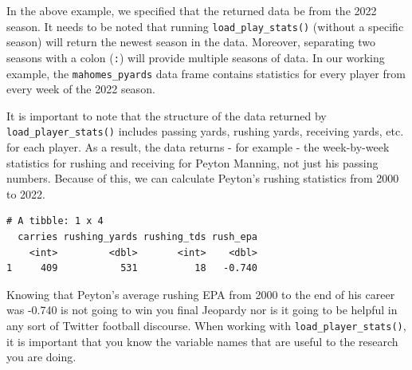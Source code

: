 \documentclass[
  letterpaper,
]{krantz}
\begin{document}
In the above example, we specified that the returned data be from the
2022 season. It needs to be noted that running
\texttt{load\_play\_stats()} (without a specific season) will return the
newest season in the data. Moreover, separating two seasons with a colon
(\texttt{:}) will provide multiple seasons of data. In our working
example, the \texttt{mahomes\_pyards} data frame contains statistics for
every player from every week of the 2022 season.

It is important to note that the structure of the data returned by
\texttt{load\_player\_stats()} includes passing yards, rushing yards,
receiving yards, etc. for each player. As a result, the data returns -
for example - the week-by-week statistics for rushing and receiving for
Peyton Manning, not just his passing numbers. Because of this, we can
calculate Peyton's rushing statistics from 2000 to 2022.

\begin{verbatim}
# A tibble: 1 x 4
  carries rushing_yards rushing_tds rush_epa
    <int>         <dbl>       <int>    <dbl>
1     409           531          18   -0.740
\end{verbatim}

Knowing that Peyton's average rushing EPA from 2000 to the end of his
career was -0.740 is not going to win you final Jeopardy nor is it going
to be helpful in any sort of Twitter football discourse. When working
with \texttt{load\_player\_stats()}, it is important that you know the
variable names that are useful to the research you are doing.
\end{document}
